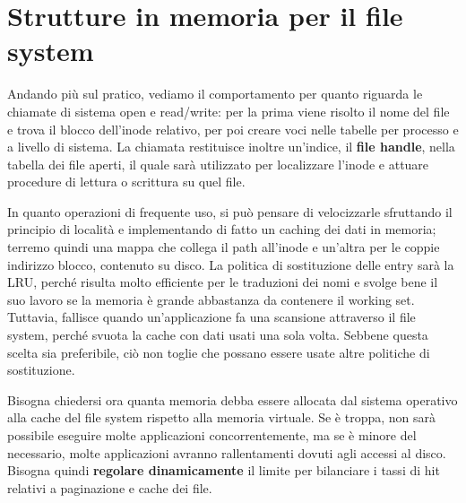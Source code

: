\section{Strutture in memoria per il file system} %
Andando più sul pratico, vediamo il comportamento per quanto riguarda le chiamate di sistema open e read/write: per la prima viene risolto il nome del
file e trova il blocco dell'inode relativo, per poi creare voci nelle tabelle per processo e a livello di sistema. La chiamata restituisce inoltre
un'indice, il \textbf{file handle}, nella tabella dei file aperti, il quale sarà utilizzato per localizzare l'inode e attuare procedure di lettura o
scrittura su quel file.\par
In quanto operazioni di frequente uso, si può pensare di velocizzarle sfruttando il principio di località e implementando di fatto un caching dei dati
in memoria; terremo quindi una mappa che collega il path all'inode e un'altra per le coppie indirizzo blocco, contenuto su disco. La politica di
sostituzione delle entry sarà la LRU, perché risulta molto efficiente per le traduzioni dei nomi e svolge bene il suo lavoro se la memoria è grande
abbastanza da contenere il working set. Tuttavia, fallisce quando un'applicazione fa una scansione attraverso il file system, perché svuota la cache con
dati usati una sola volta. Sebbene questa scelta sia preferibile, ciò non toglie che possano essere usate altre politiche di sostituzione.\par
Bisogna chiedersi ora quanta memoria debba essere allocata dal sistema operativo alla cache del file system rispetto alla memoria virtuale. Se è troppa,
non sarà possibile eseguire molte applicazioni concorrentemente, ma se è minore del necessario, molte applicazioni avranno rallentamenti dovuti agli
accessi al disco. Bisogna quindi \textbf{regolare dinamicamente} il limite per bilanciare i tassi di hit relativi a paginazione e cache dei file.

